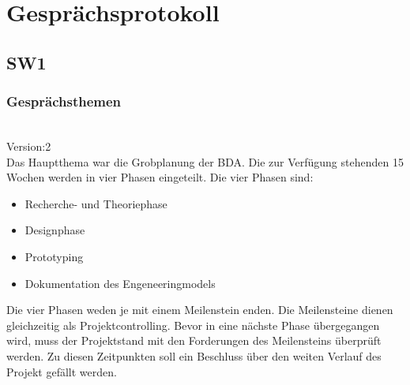 \documentclass[10pt,a4paper]{report}
\begin{document}
\chapter{Gesprächsprotokoll}
\section{SW1}
\subsection{Gesprächsthemen}

\\ Version:2 \\

Das Hauptthema war die Grobplanung der BDA. Die zur Verfügung stehenden 15 Wochen werden in vier Phasen eingeteilt. Die vier Phasen sind:
\begin{itemize}
	\item Recherche- und Theoriephase
	\item Designphase
	\item Prototyping 
	\item Dokumentation des Engeneeringmodels
\end{itemize}
Die vier Phasen weden je mit einem Meilenstein enden. Die   Meilensteine dienen gleichzeitig als Projektcontrolling. Bevor in eine nächste Phase übergegangen wird, muss der Projektstand mit den Forderungen des Meilensteins überprüft werden. Zu diesen Zeitpunkten soll  ein Beschluss über den weiten Verlauf des Projekt gefällt werden.
\end{document}
